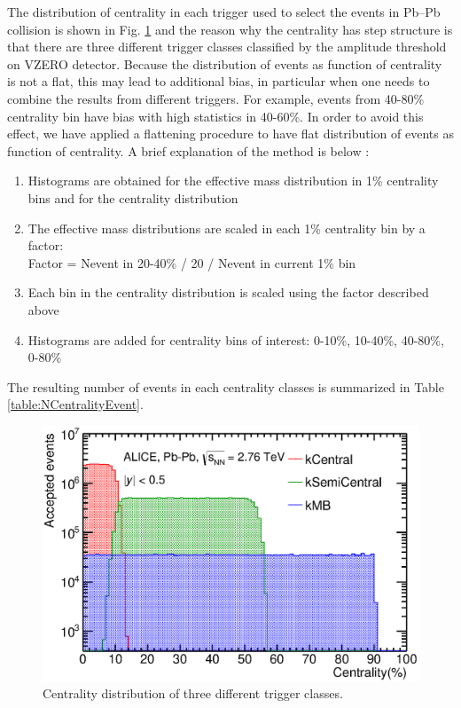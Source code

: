 The distribution of centrality in each trigger used to select the events in Pb--Pb collision is shown in Fig. \ref{fig:PbPb:Centrality} and the reason why the centrality has step structure is that there are three different trigger classes classified by the amplitude threshold on VZERO detector.
Because the distribution of events as function of centrality is not a flat, this may lead to additional bias, in particular when one needs to combine the results from different triggers. For example, events from 40-80\% centrality bin have bias with high statistics in 40-60\%. In order to avoid this effect, we have applied a flattening procedure to have flat distribution of events as function of centrality. 
A brief explanation of the method is below : 

\begin{enumerate}
\item Histograms are obtained for the effective mass distribution in 1\% centrality bins and for the centrality distribution
\item The effective mass distributions are scaled in each 1\% centrality bin by a factor: \\
Factor = N{\footnotesize event in 20-40\%} / 20 / N{\footnotesize event in current 1\% bin}
\item Each bin in the centrality distribution is scaled using the factor described above
\item Histograms are added for centrality bins of interest: 0-10\%, 10-40\%, 40-80\%, 0-80\%
\end{enumerate}

The resulting number of events in each centrality classes is summarized in Table \ref{table:NCentralityEvent}.

\begin{figure}[htbp]
\begin{center}
\includegraphics[width=10.cm]{./Version1/FigChapter5/Selection/PbPbCentrality.eps}
\caption{ Centrality distribution of three different trigger classes.}
\label{fig:PbPb:Centrality}
\end{center}
\end{figure}


